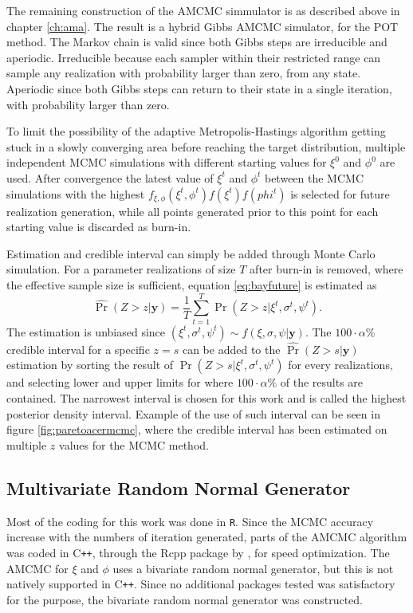 The remaining construction of the AMCMC simmulator is as described above in chapter \ref{ch:ama}. The result is a hybrid Gibbs AMCMC simulator, for the POT method. The Markov chain is valid since both Gibbs steps are irreducible and aperiodic. Irreducible because each sampler within their restricted range can sample any realization with probability larger than zero, from any state. Aperiodic since both Gibbs steps can return to their state in a single iteration, with probability larger than zero.

To limit the possibility of the adaptive Metropolis-Hastings algorithm getting stuck in a slowly converging area before reaching the target distribution, multiple independent MCMC simulations with different starting values for $\xi^0$ and $\phi ^0$ are used. After convergence the latest value of $\xi^t$ and $\phi^t$ between the MCMC simulations with the highest $f_{\xi,\phi}(\xi^t,\phi^t) f(\xi^t) f(phi^t)$ is selected for future realization generation, while all points generated prior to this point for each starting value is discarded as burn-in.   

Estimation and credible interval can simply be added through Monte Carlo simulation.
For a parameter realizations of size $T$ after burn-in is removed, where the effective sample size is sufficient, equation \eqref{eq:bayfuture} is estimated as
\begin{equation}
\label{eq:mcmcfuture}
\hat{\Pr}(Z>z|\boldsymbol{y})=\frac{1}{T}\sum_{t=1}^{T}\Pr(Z>z|\xi^t,\sigma^t,\psi^t).
\end{equation}
The estimation is unbiased since $(\xi^t,\sigma^t,\psi^t) \sim f(\xi,\sigma,\psi|\boldsymbol{y})$. 
The $100 \cdot \alpha \%$ credible interval for a specific $z=s$ can be added to the $\hat{\Pr}(Z>s| \boldsymbol{y})$ estimation by sorting the result of $\Pr(Z>s|\xi^t,\sigma^t,\psi^t)$ for every realizations, and selecting lower and upper limits for where $100 \cdot \alpha \%$ of the results are contained. The narrowest interval is chosen for this work and is called the highest posterior density interval. Example of the use of such interval can be seen in figure \ref{fig:paretoacermcmc}, where the credible interval has been estimated on multiple $z$ values for the MCMC method.

\subsection{Multivariate Random Normal Generator}
Most of the coding for this work was done in {\tt{R}}. Since the MCMC accuracy increase with the numbers of iteration generated, parts of the AMCMC algorithm was coded in C\texttt{++}, through the Rcpp package by \cite{rcpp}, for speed optimization. The AMCMC for $\xi$ and $\phi$ uses a bivariate random normal generator, but this is not natively supported in C\texttt{++}. Since no additional packages tested was satisfactory for the purpose, the bivariate random normal generator was constructed.

